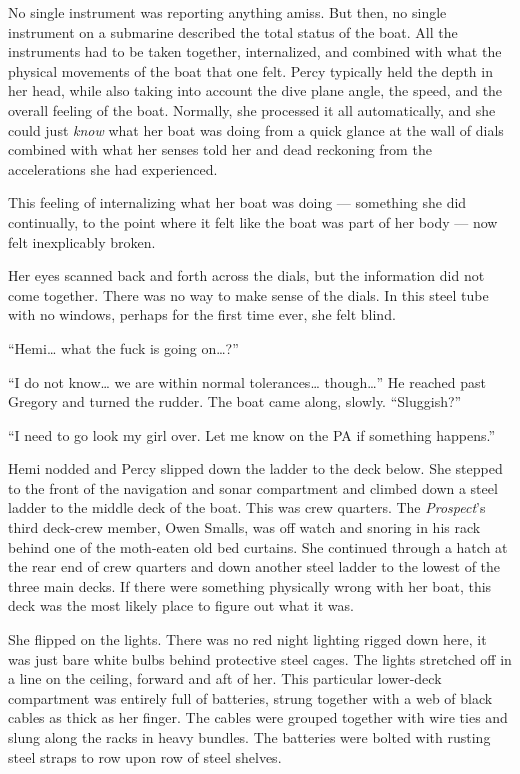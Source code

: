 \documentclass[
]{scrbook}
\begin{document}
No single instrument was reporting anything amiss. But then, no single
instrument on a submarine described the total status of the boat. All
the instruments had to be taken together, internalized, and combined
with what the physical movements of the boat that one felt. Percy
typically held the depth in her head, while also taking into account the
dive plane angle, the speed, and the overall feeling of the boat.
Normally, she processed it all automatically, and she could just
\emph{know} what her boat was doing from a quick glance at the wall of
dials combined with what her senses told her and dead reckoning from the
accelerations she had experienced.

This feeling of internalizing what her boat was doing --- something she
did continually, to the point where it felt like the boat was part of
her body --- now felt inexplicably broken.

Her eyes scanned back and forth across the dials, but the information
did not come together. There was no way to make sense of the dials. In
this steel tube with no windows, perhaps for the first time ever, she
felt blind.

``Hemi\ldots{} what the fuck is going on\ldots?''

``I do not know\ldots{} we are within normal tolerances\ldots{}
though\ldots{}'' He reached past Gregory and turned the rudder. The boat
came along, slowly. ``Sluggish?''

``I need to go look my girl over. Let me know on the PA if something
happens.''

Hemi nodded and Percy slipped down the ladder to the deck below. She
stepped to the front of the navigation and sonar compartment and climbed
down a steel ladder to the middle deck of the boat. This was crew
quarters. The \emph{Prospect}'s third deck-crew member, Owen Smalls, was
off watch and snoring in his rack behind one of the moth-eaten old bed
curtains. She continued through a hatch at the rear end of crew quarters
and down another steel ladder to the lowest of the three main decks. If
there were something physically wrong with her boat, this deck was the
most likely place to figure out what it was.

She flipped on the lights. There was no red night lighting rigged down
here, it was just bare white bulbs behind protective steel cages. The
lights stretched off in a line on the ceiling, forward and aft of her.
This particular lower-deck compartment was entirely full of batteries,
strung together with a web of black cables as thick as her finger. The
cables were grouped together with wire ties and slung along the racks in
heavy bundles. The batteries were bolted with rusting steel straps to
row upon row of steel shelves.
\end{document}
